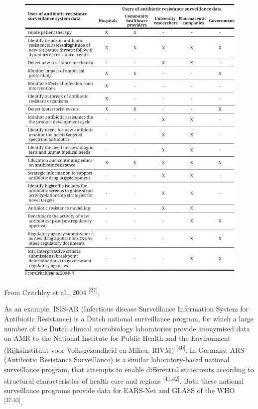 \documentclass[
]{book}
\begin{document}
\begin{figure}

{\centering \includegraphics[width=1\linewidth]{images/01-t01} 

}

\end{figure}

From Critchley et al., 2004 \textsuperscript{{[}27{]}}.

As an example, ISIS-AR (Infectious disease Surveillance Information System for Antibiotic Resistance) is a Dutch national surveillance program, for which a large number of the Dutch clinical microbiology laboratories provide anonymised data on AMR to the National Institute for Public Health and the Environment (Rijksinstituut voor Volksgezondheid en Milieu, RIVM) \textsuperscript{{[}40{]}}. In Germany, ARS (Antibiotic Resistance Surveillance) is a similar laboratory-based national surveillance program, that attempts to enable differential statements according to structural characteristics of health care and regions \textsuperscript{{[}41,42{]}}. Both these national surveillance programs provide data for EARS-Net and GLASS of the WHO \textsuperscript{{[}37,43{]}}.
\end{document}
